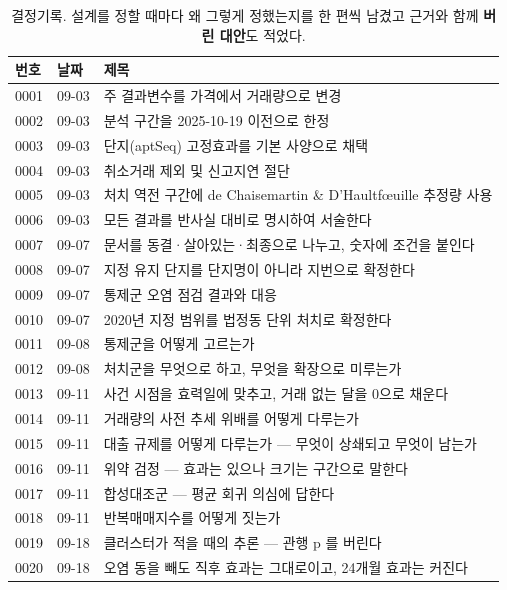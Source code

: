 \begin{table}[htbp]
  \centering
  \caption{결정기록. 설계를 정할 때마다 왜 그렇게 정했는지를 한 편씩 남겼고 근거와 함께 \textbf{버린 대안}도 적었다.}
  \label{tab:decisions}
  \begin{tabular}{llp{9.5cm}}
    \toprule
    \textbf{번호} & \textbf{날짜} & \textbf{제목} \\
    \midrule
    0001 & 09-03 & 주 결과변수를 가격에서 거래량으로 변경 \\
    0002 & 09-03 & 분석 구간을 2025-10-19 이전으로 한정 \\
    0003 & 09-03 & 단지(aptSeq) 고정효과를 기본 사양으로 채택 \\
    0004 & 09-03 & 취소거래 제외 및 신고지연 절단 \\
    0005 & 09-03 & 처치 역전 구간에 de Chaisemartin \& D'Haultfœuille 추정량 사용 \\
    0006 & 09-03 & 모든 결과를 반사실 대비로 명시하여 서술한다 \\
    0007 & 09-07 & 문서를 동결·살아있는·최종으로 나누고, 숫자에 조건을 붙인다 \\
    0008 & 09-07 & 지정 유지 단지를 단지명이 아니라 지번으로 확정한다 \\
    0009 & 09-07 & 통제군 오염 점검 결과와 대응 \\
    0010 & 09-07 & 2020년 지정 범위를 법정동 단위 처치로 확정한다 \\
    0011 & 09-08 & 통제군을 어떻게 고르는가 \\
    0012 & 09-08 & 처치군을 무엇으로 하고, 무엇을 확장으로 미루는가 \\
    0013 & 09-11 & 사건 시점을 효력일에 맞추고, 거래 없는 달을 0으로 채운다 \\
    0014 & 09-11 & 거래량의 사전 추세 위배를 어떻게 다루는가 \\
    0015 & 09-11 & 대출 규제를 어떻게 다루는가 — 무엇이 상쇄되고 무엇이 남는가 \\
    0016 & 09-11 & 위약 검정 — 효과는 있으나 크기는 구간으로 말한다 \\
    0017 & 09-11 & 합성대조군 — 평균 회귀 의심에 답한다 \\
    0018 & 09-11 & 반복매매지수를 어떻게 짓는가 \\
    0019 & 09-18 & 클러스터가 적을 때의 추론 — 관행 p 를 버린다 \\
    0020 & 09-18 & 오염 동을 빼도 직후 효과는 그대로이고, 24개월 효과는 커진다 \\

\end{tabular}
\end{table}
